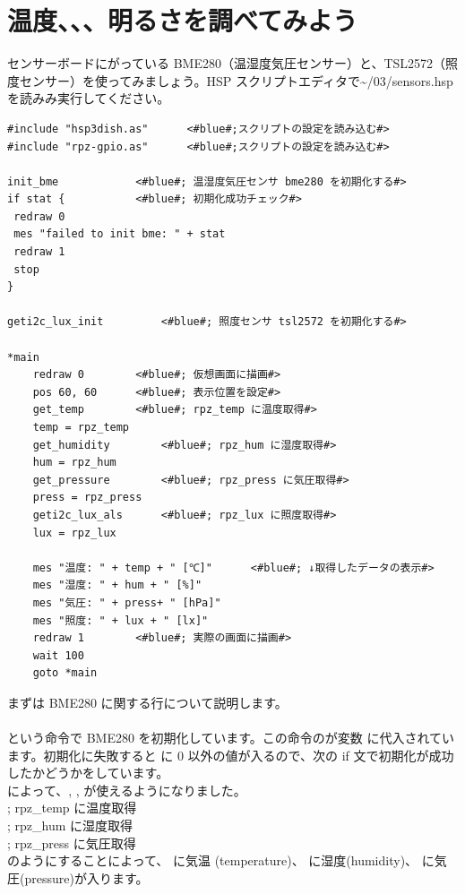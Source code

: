\documentclass[text03.tex]{subfiles}
\begin{document}
\newpage
\section{温度、、、明るさを調べてみよう}\label{sec:sensors}
センサーボードにがっている BME280（温湿度気圧センサー）と、TSL2572（照度センサー）を使ってみましょう。HSP スクリプトエディタで\textasciitilde /03/sensors.hsp を読みみ実行してください。\\

\begin{lstlisting}[caption=\textasciitilde/03/sensors.hsp,label=sensors.hsp]
#include "hsp3dish.as"		<#blue#;スクリプトの設定を読み込む#>
#include "rpz-gpio.as"		<#blue#;スクリプトの設定を読み込む#>

init_bme			<#blue#; 温湿度気圧センサ bme280 を初期化する#>
if stat { 			<#blue#; 初期化成功チェック#>
 redraw 0
 mes "failed to init bme: " + stat
 redraw 1
 stop
}

geti2c_lux_init 		<#blue#; 照度センサ tsl2572 を初期化する#>

*main
	redraw 0 		<#blue#; 仮想画面に描画#>
	pos 60, 60 		<#blue#; 表示位置を設定#>
	get_temp		<#blue#; rpz_temp に温度取得#>
	temp = rpz_temp
	get_humidity		<#blue#; rpz_hum に湿度取得#>
	hum = rpz_hum
	get_pressure		<#blue#; rpz_press に気圧取得#>
	press = rpz_press
	geti2c_lux_als		<#blue#; rpz_lux に照度取得#>
	lux = rpz_lux

	mes "温度: " + temp + " [℃]" 		<#blue#; ↓取得したデータの表示#>
	mes "湿度: " + hum + " [%]"
	mes "気圧: " + press+ " [hPa]"
	mes "照度: " + lux + " [lx]"
	redraw 1		<#blue#; 実際の画面に描画#>
	wait 100
	goto *main
\end{lstlisting}

まずは BME280 に関する行について説明します。\\
\\
という命令で BME280 を初期化しています。この命令のが変数  に代入されています。初期化に失敗すると  に 0 以外の値が入るので、次の if 文で初期化が成功したかどうかをしています。\\
 によって、, ,  が使えるようになりました。\\
	; rpz\_temp に温度取得\\
	; rpz\_hum に湿度取得\\
	; rpz\_press に気圧取得\\
のようにすることによって、 に気温 (temperature)、  に湿度(humidity)、 に気圧(pressure)が入ります。
\end{document}
